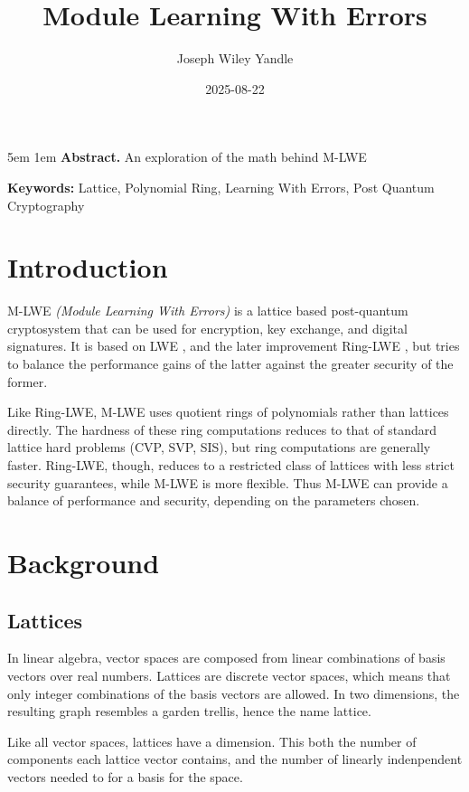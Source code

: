 \documentclass{article}
\title{Module Learning With Errors}
\date{2025-08-22}
\author{Joseph Wiley Yandle}
\begin{document}
\onecolumn
\maketitle

\begingroup
\leftskip5em
\parskip1em
\rightskip\leftskip
\noindent\textbf{Abstract.} An exploration of the math behind M-LWE

\par
\noindent\textbf{Keywords:} Lattice, Polynomial Ring, Learning With Errors, Post Quantum Cryptography
\par
\endgroup

\section{
  Introduction
}

M-LWE \emph{(Module Learning With Errors)} \cite{mlwe} is a lattice based post-quantum cryptosystem that can be used for encryption, key exchange, and digital signatures.  It is based on LWE \cite{lwe}, and the later improvement Ring-LWE \cite{ringlwe}, but tries to balance the performance gains of the latter against the greater security of the former.

Like Ring-LWE, M-LWE uses quotient rings of polynomials rather than lattices directly.  The hardness of these ring computations reduces to that of standard lattice hard problems (CVP, SVP, SIS), but ring computations are generally faster.  Ring-LWE, though, reduces to a restricted class of lattices with less strict security guarantees, while M-LWE is more flexible.  Thus M-LWE can provide a balance of performance and security, depending on the parameters chosen.

\section{
  Background
}

\subsection{
  Lattices
}

In linear algebra, vector spaces are composed from linear combinations of basis vectors over real numbers.  Lattices are discrete vector spaces, which means that only integer combinations of the basis vectors are allowed.  In two dimensions, the resulting graph resembles a garden trellis, hence the name lattice.

Like all vector spaces, lattices have a dimension.  This both the number of components each lattice vector contains, and the number of linearly indenpendent vectors needed to for a basis for the space.
\end{document}
